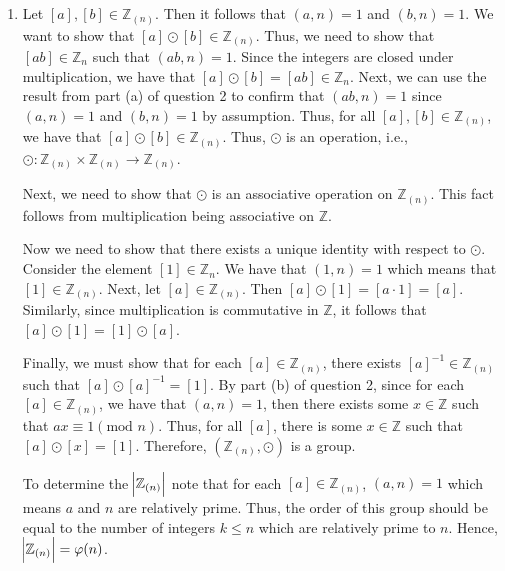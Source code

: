 \documentclass[12pt]{article}
\makeatletter
\theoremstyle{definition}
\theoremstyle{remark}
\renewenvironment{proof}[1][\proofname]{\par
  \pushQED{\qed}%
  \normalfont \topsep6\p@\@plus6\p@\relax
  \list{}{\leftmargin=0mm
          \rightmargin=4mm
          \settowidth{\itemindent}{\itshape#1}%
          \labelwidth=\itemindent
          \parsep=0pt \listparindent=\parindent 
  }
  \item[\hskip\labelsep
        \itshape
    #1\@addpunct{.}]\ignorespaces
}{%
  \popQED\endlist\@endpefalse
}
\let\oldproofname=\proofname
\renewcommand{\proofname}{\bf{\textit{\oldproofname}}}
\makeatother
\begin{document}
\begin{enumerate}[leftmargin=*]
\begin{enumerate}[label=(\alph*)]
            \begin{proof}
                Let $[a],[b]\in\mathbb{Z}_{(n)}$. Then it follows that $(a,n)=1$ and $(b,n)=1$. We want to show that $[a]\odot[b]\in\mathbb{Z}_{(n)}$. Thus, we need to show that $[ab]\in\mathbb{Z}_{n}$ such that $(ab,n)=1$. Since the integers are closed under multiplication, we have that $[a]\odot[b]=[ab]\in\mathbb{Z}_{n}$. Next, we can use the result from part (a) of question 2 to confirm that $(ab,n)=1$ since $(a,n)=1$ and $(b,n)=1$ by assumption. Thus, for all $[a],[b]\in\mathbb{Z}_{(n)}$, we have that $[a]\odot[b]\in\mathbb{Z}_{(n)}$. Thus, $\odot$ is an operation, i.e., $\odot\colon\mathbb{Z}_{(n)}\times\mathbb{Z}_{(n)}\rightarrow\mathbb{Z}_{(n)}$.\par\hspace{4mm} Next, we need to show that $\odot$ is an associative operation on $\mathbb{Z}_{(n)}$. This fact follows from multiplication being associative on $\mathbb{Z}$.\par\hspace{4mm} Now we need to show that there exists a unique identity with respect to $\odot$. Consider the element $[1]\in\mathbb{Z}_{n}$. We have that $(1,n)=1$ which means that $[1]\in\mathbb{Z}_{(n)}$. Next, let $[a]\in\mathbb{Z}_{(n)}$. Then $[a]\odot[1]=[a\cdot 1]=[a]$. Similarly, since multiplication is commutative in $\mathbb{Z}$, it follows that $[a]\odot[1]=[1]\odot[a]$.\par\hspace{4mm} Finally, we must show that for each $[a]\in\mathbb{Z}_{(n)}$, there exists $[a]^{-1}\in\mathbb{Z}_{(n)}$ such that $[a]\odot[a]^{-1}=[1]$. By part (b) of question 2, since for each $[a]\in\mathbb{Z}_{(n)}$, we have that $(a,n)=1$, then there exists some $x\in\mathbb{Z}$ such that $ax\equiv 1(\text{mod }n)$. Thus, for all $[a]$, there is some $x\in\mathbb{Z}$ such that $[a]\odot[x]=[1]$. Therefore, $(\mathbb{Z}_{(n)},\odot)$ is a group.\par\hspace{4mm} To determine the $\abs{\mathbb{Z}_{(n)}}$ note that for each $[a]\in\mathbb{Z}_{(n)}$, $(a,n)=1$ which means $a$ and $n$ are relatively prime. Thus, the order of this group should be equal to the number of integers $k\leq n$ which are relatively prime to $n$. Hence, $\abs{\mathbb{Z}_{(n)}}=\varphi(n)$. 
            \end{proof}
            
        \end{enumerate}
        

\end{enumerate}
\end{document}
